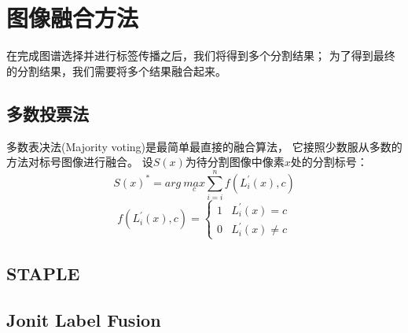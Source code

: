 \section{图像融合方法} %
在完成图谱选择并进行标签传播之后，我们将得到多个分割结果；
为了得到最终的分割结果，我们需要将多个结果融合起来。

\subsection{多数投票法}
%
%
%
多数表决法(Majority voting)是最简单最直接的融合算法，
它接照少数服从多数的方法对标号图像进行融合。
设$S(x)$为待分割图像中像素$x$处的分割标号：
\begin{equation}
  S(x)^\ast=arg\ \underset{c}{max}\sum_{i=i}^nf(L_i^\prime(x),c)
\end{equation}
\begin{equation}
  f(L_i^\prime(x),c)=
  \begin{cases}
    1& L_i^\prime(x)=c\\
    0& L_i^\prime(x)\ne c
  \end{cases}
\end{equation}


\subsection{STAPLE}

\subsection{Jonit Label Fusion}
